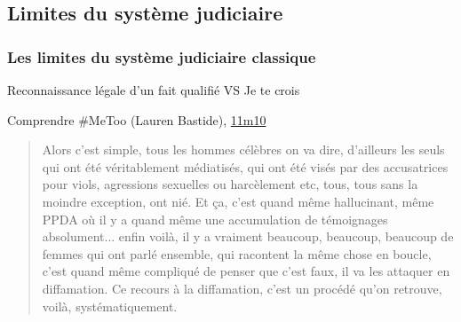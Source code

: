 \documentclass[french]{beamer}
\begin{document}
\subsection{Limites du système judiciaire}
\begin{frame}
  \frametitle{Les limites du système judiciaire classique}
  Reconnaissance légale d’un fait qualifié VS \og{}Je te crois\fg{}
  \begin{block}{Comprendre \#MeToo (Lauren Bastide), \href{https://podcasts.musixmatch.com/podcast/01gz0dx010r13t2j6yymscmvrf/episode/01gz0dx010r13t2j6yymscmvrp?time=670.945}{11m10}}
    \begin{quote}
      Alors c’est simple, tous les hommes célèbres on va dire, d’ailleurs les seuls qui ont été véritablement médiatisés, qui ont été visés par des accusatrices pour viols, agressions sexuelles ou harcèlement etc, tous, tous sans la moindre exception, ont nié. Et ça, c’est quand même hallucinant, même PPDA où il y a quand même une accumulation de témoignages absolument... enfin voilà, il y a vraiment beaucoup, beaucoup, beaucoup de femmes qui ont parlé ensemble, qui racontent la même chose en boucle, c’est quand même compliqué de penser que c’est faux, il va les attaquer en diffamation. Ce recours à la diffamation, c’est un procédé qu’on retrouve, voilà, systématiquement.

\end{quote}
\end{block}
\end{frame}
\end{document}
